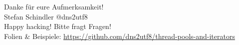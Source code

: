 \documentclass[aspectratio=1610,t]{beamer}
\begin{document}
{
\begin{frame}[standout]
	\begin{centering}
	{\Huge Danke für eure Aufmerksamkeit!}\\
	{\normalsize Stefan Schindler @dns2utf8 }\\
  {\normalsize Happy hacking! Bitte fragt Fragen! }\\
	{\footnotesize Folien \& Beispiele: \url{https://github.com/dns2utf8/thread-pools-and-iterators}}\\
	\end{centering}
\end{frame}
}
\end{document}
